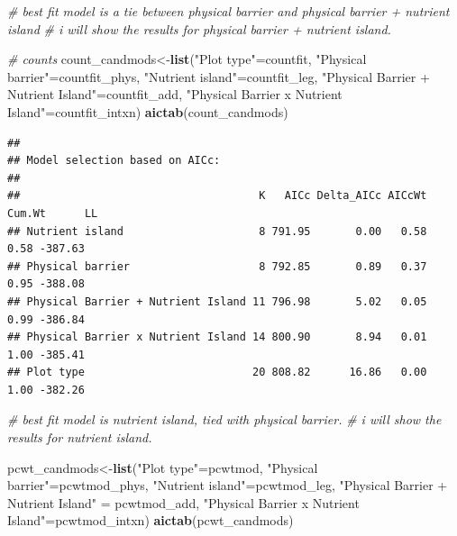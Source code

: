 \documentclass[
]{article}
\newenvironment{Shaded}{\begin{snugshade}}{\end{snugshade}}
\newcommand{\CommentTok}[1]{\textcolor[rgb]{0.56,0.35,0.01}{\textit{#1}}}
\newcommand{\FunctionTok}[1]{\textcolor[rgb]{0.13,0.29,0.53}{\textbf{#1}}}
\newcommand{\NormalTok}[1]{#1}
\newcommand{\OtherTok}[1]{\textcolor[rgb]{0.56,0.35,0.01}{#1}}
\newcommand{\StringTok}[1]{\textcolor[rgb]{0.31,0.60,0.02}{#1}}
\begin{document}
\begin{Shaded}
\begin{Highlighting}[]
\CommentTok{\# best fit model is a tie between physical barrier and physical barrier + nutrient island}
\CommentTok{\# i will show the results for physical barrier + nutrient island. }

\CommentTok{\# counts}
\NormalTok{count\_candmods}\OtherTok{\textless{}{-}}\FunctionTok{list}\NormalTok{(}\StringTok{"Plot type"}\OtherTok{=}\NormalTok{countfit, }
                     \StringTok{"Physical barrier"}\OtherTok{=}\NormalTok{countfit\_phys,}
                     \StringTok{"Nutrient island"}\OtherTok{=}\NormalTok{countfit\_leg,}
                     \StringTok{"Physical Barrier + Nutrient Island"}\OtherTok{=}\NormalTok{countfit\_add,}
                     \StringTok{"Physical Barrier x Nutrient Island"}\OtherTok{=}\NormalTok{countfit\_intxn)}
\FunctionTok{aictab}\NormalTok{(count\_candmods)}
\end{Highlighting}
\end{Shaded}

\begin{verbatim}
## 
## Model selection based on AICc:
## 
##                                     K   AICc Delta_AICc AICcWt Cum.Wt      LL
## Nutrient island                     8 791.95       0.00   0.58   0.58 -387.63
## Physical barrier                    8 792.85       0.89   0.37   0.95 -388.08
## Physical Barrier + Nutrient Island 11 796.98       5.02   0.05   0.99 -386.84
## Physical Barrier x Nutrient Island 14 800.90       8.94   0.01   1.00 -385.41
## Plot type                          20 808.82      16.86   0.00   1.00 -382.26
\end{verbatim}

\begin{Shaded}
\begin{Highlighting}[]
\CommentTok{\# best fit model is nutrient island, tied with physical barrier. }
\CommentTok{\# i will show the results for nutrient island.}

\NormalTok{pcwt\_candmods}\OtherTok{\textless{}{-}}\FunctionTok{list}\NormalTok{(}\StringTok{"Plot type"}\OtherTok{=}\NormalTok{pcwtmod, }
                    \StringTok{"Physical barrier"}\OtherTok{=}\NormalTok{pcwtmod\_phys,}
                    \StringTok{"Nutrient island"}\OtherTok{=}\NormalTok{pcwtmod\_leg,}
                    \StringTok{"Physical Barrier + Nutrient Island"} \OtherTok{=}\NormalTok{ pcwtmod\_add,}
                    \StringTok{"Physical Barrier x Nutrient Island"}\OtherTok{=}\NormalTok{pcwtmod\_intxn)}
\FunctionTok{aictab}\NormalTok{(pcwt\_candmods)}
\end{Highlighting}
\end{Shaded}
\end{document}
